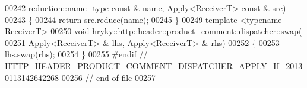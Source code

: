 \begin{DoxyCode}
00242     \hyperlink{namespacehryky_1_1reduction_ac686c30a4c8d196bbd0f05629a6b921f}{reduction::name_type} \textcolor{keyword}{const} & name, Apply<ReceiverT> \textcolor{keyword}{const} & src)
00243 \{
00244     \textcolor{keywordflow}{return} src.reduce(name);
00245 \}
00249 \textcolor{keyword}{template} <\textcolor{keyword}{typename} ReceiverT>
00250 \textcolor{keywordtype}{void} \hyperlink{namespacehryky_1_1http_a38e62595ad532d18fbc65ceb61973aec}{hryky::http::header::product_comment::dispatcher::swap}(
00251     Apply<ReceiverT> & lhs, Apply<ReceiverT> & rhs)
00252 \{
00253     lhs.swap(rhs);
00254 \}
00255 \textcolor{preprocessor}{#endif // HTTP\_HEADER\_PRODUCT\_COMMENT\_DISPATCHER\_APPLY\_H\_20130113142642268}
00256 \textcolor{preprocessor}{}\textcolor{comment}{// end of file}
00257 
\end{DoxyCode}
